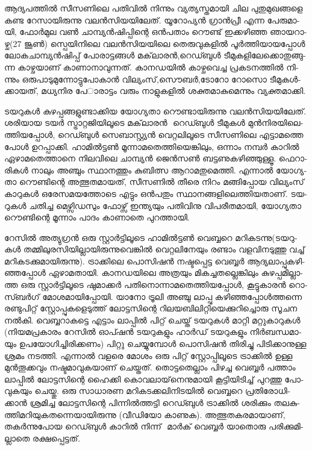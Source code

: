 
\vskip 2pt


ആ­ദ്യ­പ­ത്തില്‍ സീ­സ­ണി­ലെ പതി­വില്‍ നി­ന്നും വ്യ­ത്യ­സ്ത­മാ­യി ചില പു­തു­മു­ഖ­ങ്ങ­ളെ കണ്ട റേ­സാ­യി­രു­ന്നു വലന്‍­സി­യ­യി­ലേ­ത്. ­യൂ­റോ­പ്യന്‍ 
ഗ്രാന്‍­പ്രീ­ എന്ന പേ­രു­മാ­യി, ­ഫോര്‍­മുല വണ്‍ ചാ­മ്പ്യന്‍­ഷി­പ്പി­ന്റെ ഒന്‍­പ­താം റൌ­ണ്ട് ഇക്ക­ഴി­ഞ്ഞ ഞാ­യ­റാ­ഴ്ച(27 ജൂണ്‍) സ്പെ­യി­നി­ലെ 
വലന്‍­സി­യ­യി­ലെ തെ­രു­വു­ക­ളില്‍ പൂര്‍­ത്തി­യാ­യ­പ്പോള്‍ ലോ­ക­ചാ­മ്പ്യന്‍­ഷി­പ്പ് പോ­രാ­ട്ട­ങ്ങള്‍ മക്‌­ലാ­രന്‍,­റെ­ഡ്ബുള്‍ ടീ­മു­ക­ളി­ലേ­ക്കൊ­തു­ങ്ങു­ന്ന
 കാ­ഴ്ച­യാ­ണ് കാ­ണാ­നാ­വു­ന്ന­ത്. കാ­ന­ഡ­യില്‍ കാ­ഴ്ച­വെ­ച്ച പ്ര­ക­ട­ന­ത്തില്‍ നി­ന്നും ഒരു­പാ­ടു­മു­ന്നോ­ട്ടു­പോ­കാന്‍ വി­ല്യം­സ്,­സൌ­ബര്‍,­ടോ­റോ
  റോ­സൊ ടീ­മു­കള്‍­ക്കാ­യ­ത്, മധ്യ­നിര പേ­ാ­രാ­ട്ടം വരും നാ­ളു­ക­ളില്‍ ശക്ത­മാ­കു­മെ­ന്നും വ്യ­ക്ത­മാ­ക്കി.

­ട­യ­റു­കള്‍ കു­ഴ­പ്പ­ങ്ങ­ളു­ണ്ടാ­ക്കിയ യോ­ഗ്യ­താ റൌ­ണ്ടാ­യി­രു­ന്നു വലന്‍­സി­യ­യി­ലേ­ത്. ശരി­യായ ടയര്‍ സ്ട്രാ­റ്റ­ജി­യി­ലൂ­ടെ മക്‌­ലാ­രന്‍ ­
റെ­ഡ്ബുള്‍ ടീ­മു­കള്‍ മുന്‍­നി­ര­യി­ലെ­ത്തി­യ­പ്പോള്‍, റെ­ഡ്ബുള്‍ സെ­ബാ­സ്റ്റ്യന്‍ വെ­റ്റ­ലി­ലൂ­ടെ സീ­സ­ണി­ലെ എട്ടാ­മ­ത്തെ പോള്‍ ഉറ­പ്പാ­ക്കി.
 ഹാ­മില്‍­ട്ടണ്‍ മൂ­ന്നാ­മ­തെ­ത്തി­യെ­ങ്കി­ലും, ഒന്നാം നമ്പര്‍ കാ­റില്‍ ഏഴാ­മ­തെ­ത്താ­നെ നി­ല­വി­ലെ ചാ­മ്പ്യന്‍ ജെന്‍­സണ്‍ ബട്ട­ണു­ക­ഴി­ഞ്ഞു­ള്ളൂ. 
 ഫെ­റാ­രി­കള്‍ നാ­ലും അഞ്ചും സ്ഥാ­ന­ത്തും കു­ബി­ത്സ ആറാ­മ­തു­മെ­ത്തി. എന്നാല്‍ യോ­ഗ്യ­താ റൌ­ണ്ടി­ന്റെ അത്ഭു­ത­മാ­യ­ത്, സീ­സ­ണില്‍ 
 തീ­രെ നി­റം മങ്ങി­പ്പോയ ­വി­ല്യം­സ് കാ­റു­കള്‍ ഒരേ­സ­മ­യ­ത്തോ­ടെ എട്ടും ഒന്‍­പ­തും സ്ഥാ­ന­ങ്ങ­ളി­ലെ­ത്തി­യ­താ­ണ്. ടയ­റു­കള്‍ ചതി­ച്ച 
 മെ­ഴ്സി­ഡ­സും ഫോ­ഴ്സ് ഇന്ത്യ­യും പതി­വി­നു വി­പ­രീ­ത­മാ­യി, യോ­ഗ്യ­താ റൌ­ണ്ടി­ന്റെ മൂ­ന്നാം പാ­ദം കാ­ണാ­തെ പു­റ­ത്താ­യി­.

­റേ­സില്‍ അത്യു­ഗ്രന്‍ ഒരു സ്റ്റാര്‍­ട്ടി­ലൂ­ടെ ഹാ­മില്‍­ട്ടണ്‍ വെ­ബ്ബ­റെ മറി­ക­ട­ന്നു­(­ട­യ­റു­കള്‍ തമ്മി­ലു­ര­സി­യി­ല്ലാ­യി­രു­ന്നു­വെ­ങ്കില്‍ വെ­റ്റ­ലി­നേ­യും 
രണ്ടാം വള­വി­ന­ടു­ത്തു വച്ച് മറി­ക­ട­ക്കു­മാ­യി­രു­ന്നു­). ട്രാ­ക്കി­ലെ പൊ­സി­ഷന്‍ നഷ്ട­പ്പെ­ട്ട വെ­ബ്ബര്‍ ആദ്യ­ലാ­പ്പു­ക­ഴി­ഞ്ഞ­പ്പോള്‍ ഏഴാ­മ­താ­യി.
 കാ­ന­ഡ­യി­ലെ അത്ര­യും മി­ക­ച്ച­ത­ല്ലെ­ങ്കി­ലും കു­ഴ­പ്പ­മി­ല്ലാ­ത്ത ഒരു സ്റ്റാര്‍­ട്ടി­ലൂ­ടെ ഷു­മാ­ക്കര്‍ പതി­നൊ­ന്നാ­മ­തെ­ത്തി­യ­പ്പോള്‍, കൂ­ട്ടു­കാ­രന്‍ 
 റൊ­സ്ബര്‍­ഗ് മോ­ശ­മാ­യി­പ്പോ­യി. ­യാ­നോ ട്രൂ­ലി­ അഞ്ചു ലാ­പ്പു കഴി­ഞ്ഞ­പ്പോള്‍­ത്ത­ന്നെ രണ്ടു­പി­റ്റ് സ്റ്റോ­പ്പു­ക­ളെ­ടു­ത്ത് ലോ­ട്ട­സി­ന്റെ 
 റി­ല­യ­ബി­ലി­റ്റി­യെ­ക്കു­റി­ച്ചൊ­രു സൂ­ചന നല്‍­കി. വെ­ബ്ബ­റാ­ക­ട്ടെ എട്ടാം ലാ­പ്പില്‍ പി­റ്റ് ചെ­യ്ത് ടയ­റു­കള്‍ മാ­റ്റി മറ്റു­കാ­റു­കള്‍ (നി­യ­മ­പ്ര­കാ­രം 
 റേ­സില്‍ ഓപ്ഷന്‍ ടയ­റു­ക­ളും ഹാര്‍­ഡ് ടയ­റു­ക­ളും നിര്‍­ബ­ന്ധ­മാ­യും ഉപ­യോ­ഗി­ച്ചി­രി­ക്ക­ണം) പി­റ്റു ചെ­യ്യു­മ്പോള്‍ പൊ­സി­ഷന്‍ തി­രി­ച്ചു
  പി­ടി­ക്കാ­നു­ള്ള ശ്ര­മം നട­ത്തി. എന്നാല്‍ വള­രെ മോ­ശം ഒരു പി­റ്റ് സ്റ്റോ­പ്പി­ലൂ­ടെ ട്രാ­ക്കില്‍ ഉള്ള മുന്‍­തൂ­ക്ക­വും നഷ്ട­മാ­വു­ക­യാ­ണ് ചെ­യ്ത­ത്.
   തൊ­ട്ട­തെ­ല്ലാം പി­ഴ­ച്ച വെ­ബ്ബര്‍ പത്താം ലാ­പ്പില്‍ ലോ­ട്ട­സി­ന്റെ ഹൈ­ക്കി കൊ­വ­ലാ­യ്‌­നെ­നു­മാ­യി കൂ­ട്ടി­യി­ടി­ച്ച് പു­റ­ത്തു പോ­വു­ക­യും ചെ­യ്തു. 
   ഒരു സാ­ധാ­രണ മറി­ക­ട­ക്ക­ലി­നി­ട­യില്‍ വെ­ബ്ബ­റെ പ്ര­തി­രോ­ധി­ക്കാന്‍ ശ്ര­മി­ച്ച ലോ­ട്ട­സി­ന്റെ പി­ന്നില്‍­ത്ത­ട്ടി റെ­ഡ്ബുള്‍ ട്രാ­ക്കില്‍ ശരി­ക്കും 
   തല­കു­ത്തി­മ­റി­യു­ക­ത­ന്നെ­യാ­യി­രു­ന്നു (വീഡിയോ കാ­ണു­ക). അത്ഭു­ത­ക­ര­മാ­യാ­ണ്, തകര്‍­ന്നു­പോയ റെ­ഡ്ബുള്‍ കാ­റില്‍ നി­ന്ന് ­
   മാര്‍­ക് വെ­ബ്ബര്‍ യാ­തൊ­രു പരി­ക്കു­മി­ല്ലാ­തെ രക്ഷ­പ്പെ­ട്ട­ത്.

